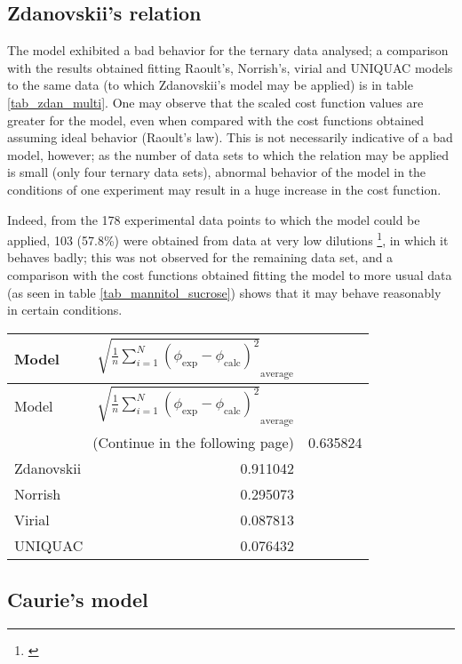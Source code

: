 \subsection{Zdanovskii's relation}

The model exhibited a bad behavior for the ternary data analysed; a comparison
with the results obtained fitting Raoult's, Norrish's, virial and UNIQUAC models
to the same data (to which Zdanovskii's model may be applied) is in table
\ref{tab_zdan_multi}. One may observe that the scaled cost function values are
greater for the model, even when compared with the cost functions obtained assuming
ideal behavior (Raoult's law). This is not necessarily indicative of a bad model,
however; as the number of data sets to which the relation may be applied is small
(only four ternary data sets), abnormal behavior of the model in the conditions
of one experiment may result in a huge increase in the cost function.

Indeed, from the 178 experimental data points to which the model could be applied,
103 (57.8\%) were obtained from data at very low dilutions
\footnote{\cite{abderafi1994}}, in which it behaves badly; this was not observed
for the remaining data set, and a comparison with the cost functions obtained fitting
the model to more usual data (as seen in table \ref{tab_mannitol_sucrose}) shows
that it may behave reasonably in certain conditions.

\begin{tabularx}{\textwidth}{ X  r }
	\caption{Comparison Zdanovskii's model}
	\label{tab_zdan_multi}\\
	\toprule
	Model & %
		$\sqrt{\frac{1}{n}\sum_{i=1}^N(\phi_{\text{exp}}-%
		\phi_{\text{calc}})^2}_\text{average}$\\
	\midrule
	\endfirsthead
	\toprule
	Model & %
		$\sqrt{\frac{1}{n}\sum_{i=1}^N(\phi_{\text{exp}}-%
		\phi_{\text{calc}})^2}_\text{average}$\\\hline
	\midrule
	\endhead
	\midrule
	\multicolumn{2}{r}{\footnotesize(Continue in the following page)}
	\endfoot
	\endlastfoot
	Raoult & 0.635824 \\
	Zdanovskii & 0.911042 \\
	Norrish & 0.295073 \\
	Virial & 0.087813 \\
	UNIQUAC & 0.076432 \\\hline
\end{tabularx}

\subsection{Caurie's model}

